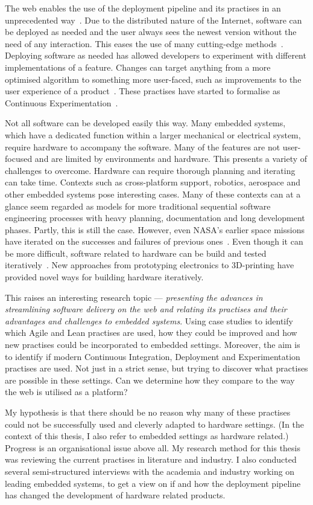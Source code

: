\documentclass[english]{tktltiki2}
\begin{document}
The web enables the use of the deployment pipeline and its practises in an unprecedented way~\cite{KLS09}. Due to the distributed nature of the Internet, software can be deployed as needed and the user always sees the newest version without the need of any interaction. This eases the use of many cutting-edge methods~\cite{KLS09, FGM14}. Deploying software as needed has allowed developers to experiment with different implementations of a feature. Changes can target anything from a more optimised algorithm to something more user-faced, such as improvements to the user experience of a product~\cite{KLS09}. These practises have started to formalise as Continuous Experimentation~\cite{FGM14}.

Not all software can be developed easily this way. Many embedded systems, which have a dedicated function within a larger mechanical or electrical system, require hardware to accompany the software. Many of the features are not user-focused and are limited by environments and hardware. This presents a variety of challenges to overcome. Hardware can require thorough planning and iterating can take time. Contexts such as cross-platform support, robotics, aerospace and other embedded systems pose interesting cases. Many of these contexts can at a glance seem regarded as models for more traditional sequential software engineering processes with heavy planning, documentation and long development phases. Partly, this is still the case. However, even NASA’s earlier space missions have iterated on the successes and failures of previous ones~\cite{LB03}. Even though it can be more difficult, software related to hardware can be build and tested iteratively~\cite{LB03}. New approaches from prototyping electronics to 3D-printing have provided novel ways for building hardware iteratively.

This raises an interesting research topic — \emph{presenting the advances in streamlining software delivery on the web and relating its practises and their advantages and challenges to embedded systems}. Using case studies to identify which Agile and Lean practises are used, how they could be improved and how new practises could be incorporated to embedded settings. Moreover, the aim is to identify if modern Continuous Integration, Deployment and Experimentation practises are used. Not just in a strict sense, but trying to discover what practises are possible in these settings. Can we determine how they compare to the way the web is utilised as a platform?

My hypothesis is that there should be no reason why many of these practises could not be successfully used and cleverly adapted to hardware settings. (In the context of this thesis, I also refer to embedded settings as hardware related.) Progress is an organisational issue above all. My research method for this thesis was reviewing the current practises in literature and industry. I also conducted several semi-structured interviews with the academia and industry working on leading embedded systems, to get a view on if and how the deployment pipeline has changed the development of hardware related products.
\end{document}
